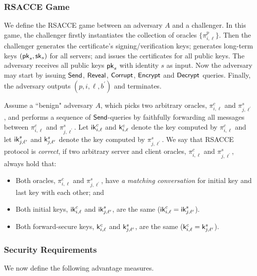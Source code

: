 \subsubsection{RSACCE Game}
We define the RSACCE game between an adversary $A$ and
a challenger.
In this game, the challenger firstly instantiates the
collection of oracles $\{\pi^p_{i,\ell}\}$.
Then the challenger generates the certificate's
signing/verification keys; generates long-term keys
$(\mathsf{pk}_s, \mathsf{sk}_s)$ for all servers; and issues the
certificates for all public keys.
The adversary receives all public keys $\mathsf{pk}_s$ with
identity $s$ as input.
Now the adversary may start by issuing $\mathsf{Send}$,
$\mathsf{Reveal}$, $\mathsf{Corrupt}$, $\mathsf{Encrypt}$ and $\mathsf{Decrypt}$ queries.
Finally, the adversary outputs
$(p, i, \ell, b^{\prime})$ and terminates.

\begin{definition}[Correctness]
 Assume a ``benign" adversary $A$, which picks two
 arbitrary oracles, $\pi^c_{i, \ell}$ and
 $\pi^s_{j, \ell^{\prime}}$, and performs a sequence of
 $\mathsf{Send}$-queries by faithfully forwarding all messages
 between $\pi^c_{i, \ell}$ and $\pi^s_{j, \ell^{\prime}}$.
 Let $\mathsf{ik}^c_{i, \ell}$ and $\mathsf{k}^c_{i, \ell}$ denote the
 key computed by $\pi^c_{i, \ell}$ and let
 $\mathsf{ik}^s_{j, \ell^{\prime}}$ and $\mathsf{k}^s_{j, \ell^{\prime}}$
 denote the key computed by $\pi^s_{j, \ell^{\prime}}$.
 We say that RSACCE protocol is \textit{correct}, if two
 arbitrary server and client oracles, $\pi^c_{i, \ell}$
 and $\pi^s_{j, \ell^{\prime}}$, always hold that:
 \begin{itemize}
  \item{Both oracles, $\pi^c_{i, \ell}$ and
  $\pi^s_{j, \ell^{\prime}}$, have
  \textit{a matching conversation} for initial key
  and last key with each other; and}

  \item{Both initial keys, $\mathsf{ik}^c_{i, \ell}$ and
  $\mathsf{ik}^s_{j, \ell^{\prime}}$, are the same
  ($\mathsf{ik}^c_{i, \ell} = \mathsf{ik}^s_{j, \ell^{\prime}}$).}

  \item{Both forward-secure keys, $\mathsf{k}^c_{i, \ell}$ and
  $\mathsf{k}^s_{j, \ell^{\prime}}$, are the same
  ($\mathsf{k}^c_{i, \ell} = \mathsf{k}^s_{j, \ell^{\prime}}$).}
 \end{itemize}
\end{definition}

\subsubsection{Security Requirements}
We now define the following advantage measures.

